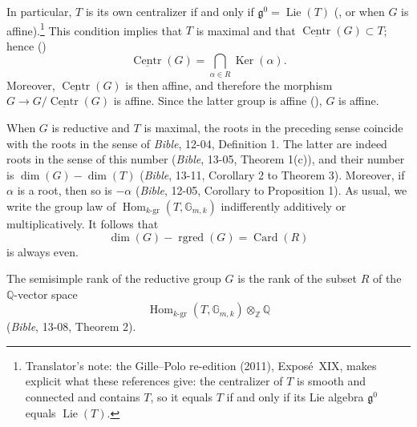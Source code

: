 In particular, \(T\) is its own centralizer if and only if
\(\mathfrak g^{0}=\operatorname{Lie}(T)\)
(, or  when \(G\) is affine).\footnote{Translator's note: the Gille--Polo re-edition (2011), Exposé~XIX, makes
explicit what these references give: the centralizer of \(T\) is smooth and
connected and contains \(T\), so it equals \(T\) if and only if its Lie
algebra \(\mathfrak g^{0}\) equals \(\operatorname{Lie}(T)\).}  This
condition implies that \(T\) is maximal and that
\(\underline{\operatorname{Centr}}(G)\subset T\); hence
()
\[
  \underline{\operatorname{Centr}}(G)
  =
  \bigcap_{\alpha\in R}\operatorname{Ker}(\alpha).
\]
Moreover, \(\underline{\operatorname{Centr}}(G)\) is then affine, and
therefore the morphism
\(G\longrightarrow G/\underline{\operatorname{Centr}}(G)\) is affine.
Since the latter group is affine (), \(G\) is affine.

When \(G\) is reductive and \(T\) is maximal, the roots in the preceding
sense coincide with the roots in the sense of \emph{Bible}, 12-04,
Definition 1.  The latter are indeed roots in the sense of this number
(\emph{Bible}, 13-05, Theorem 1(c)), and their number is
\(\dim(G)-\dim(T)\) (\emph{Bible}, 13-11, Corollary 2 to Theorem 3).
Moreover, if \(\alpha\) is a root, then so is \(-\alpha\)
(\emph{Bible}, 12-05, Corollary to Proposition 1).  As usual, we write
the group law of
\(\operatorname{Hom}_{k\text{-}\mathrm{gr}}
  (T,\mathbb G_{m,k})\)
indifferently additively or multiplicatively.  It follows that
\[
  \dim(G)-\operatorname{rgred}(G)=\operatorname{Card}(R)
\]
is always even.

The semisimple rank of the reductive group \(G\) is the rank of the
subset \(R\) of the \(\mathbb Q\)-vector space
\[
  \operatorname{Hom}_{k\text{-}\mathrm{gr}}
    (T,\mathbb G_{m,k})\otimes_{\mathbb Z}\mathbb Q
\]
(\emph{Bible}, 13-08, Theorem 2).
